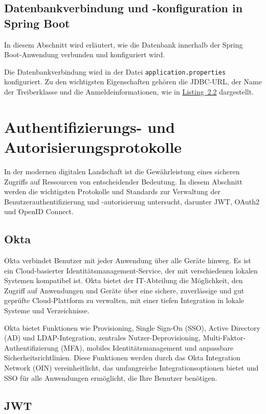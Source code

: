 \subsection{Datenbankverbindung und -konfiguration in Spring Boot}
In diesem Abschnitt wird erläutert, wie die Datenbank innerhalb der Spring Boot-Anwendung verbunden und konfiguriert wird.

Die Datenbankverbindung wird in der Datei \texttt{application.properties} konfiguriert. Zu den wichtigsten Eigenschaften gehören die JDBC-URL, der Name der Treiberklasse und die Anmeldeinformationen, wie in \hyperref[Application.properties]{Listing~2.2} dargestellt.

\section{Authentifizierungs- und Autorisierungsprotokolle}

In der modernen digitalen Landschaft ist die Gewährleistung eines sicheren Zugriffs auf Ressourcen von entscheidender Bedeutung. In diesem Abschnitt werden die wichtigsten Protokolle und Standards zur Verwaltung der Benutzerauthentifizierung und -autorisierung untersucht, darunter JWT, OAuth2 und OpenID Connect.

\subsection{Okta}
Okta verbindet Benutzer mit jeder Anwendung über alle Geräte hinweg. Es ist ein Cloud-basierter Identitätsmanagement-Service, der mit verschiedenen lokalen Systemen kompatibel ist. Okta bietet der IT-Abteilung die Möglichkeit, den Zugriff auf Anwendungen und Geräte über eine sichere, zuverlässige und gut geprüfte Cloud-Plattform zu verwalten, mit einer tiefen Integration in lokale Systeme und Verzeichnisse.

Okta bietet Funktionen wie Provisioning, Single Sign-On (SSO), Active Directory (AD) und LDAP-Integration, zentrales Nutzer-Deprovisioning, Multi-Faktor-Authentifizierung (MFA), mobiles Identitätsmanagement und anpassbare Sicherheitsrichtlinien. Diese Funktionen werden durch das Okta Integration Network (OIN) vereinheitlicht, das umfangreiche Integrationsoptionen bietet und SSO für alle Anwendungen ermöglicht, die Ihre Benutzer benötigen\cite{Okta:o.J}.

\subsection{JWT}

